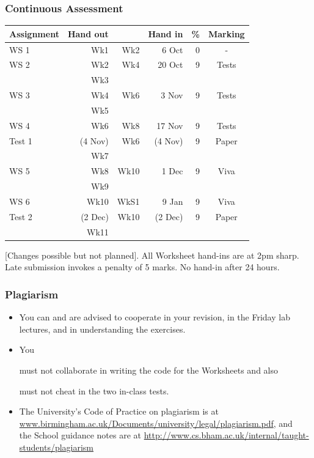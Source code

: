 \documentclass{beamer}
\def\mcolor#1#2{\rule{0ex}{0ex}\color{#1}#2\color{black}{}}
\begin{document}
\begin{frame}
\frametitle{Continuous Assessment}
\begin{tabular}{|l@{\quad}|r@{\quad}|r@{\ }r@{\qquad}|r|c|}\hline
Assignment&Hand out&&Hand in &  \%  & Marking\\\hline\hline
 WS 1   &  Wk1 & Wk2& 6 Oct  &  0   & - \\\hline %
 WS 2   &  Wk2 & Wk4&20 Oct  &  9   & Tests\\\hline
        &  Wk3 &    &        &      & \\\hline
 WS 3   &  Wk4 & Wk6&3 Nov   &  9   & Tests\\\hline
        &  Wk5 &    &        &      & \\\hline
 WS 4   &  Wk6 & Wk8&17 Nov  &  9   & Tests\\
 Test 1 &(4 Nov)&Wk6& (4 Nov)&  9   & Paper\\\hline
        &  Wk7 &    &        &      & \\\hline
 WS 5   &  Wk8 &Wk10& 1 Dec  &  9   & Viva \\\hline
        &  Wk9 &    &        &      & \\\hline
 WS 6   &  Wk10&WkS1& 9 Jan  &  9   & Viva\\
 Test 2 &(2 Dec)&Wk10&(2 Dec)&9     & Paper\\\hline
        & Wk11      &  &     &      & \\\hline

\end{tabular}\smallskip

\mcolor{blue}{[Changes possible but not planned]}. All Worksheet
hand-ins are at 2pm sharp. Late submission invokes a penalty of 5
marks. No hand-in after 24 hours.

\end{frame}

\begin{frame}
\frametitle{Plagiarism}
\begin{itemize}
\item You can and are advised to cooperate in your revision, in the Friday lab lectures, and in understanding the exercises.
\item You \mcolor{red}{must not collaborate} in writing the code for the Worksheets and also \mcolor{red}{must not cheat} in the two in-class tests.
\item The University's Code of Practice on plagiarism is at {\footnotesize\url{www.birmingham.ac.uk/Documents/university/legal/plagiarism.pdf}}, and\\ the School guidance notes are at
\url{http://www.cs.bham.ac.uk/internal/taught-students/plagiarism}
\end{itemize}
\end{frame}
\end{document}
